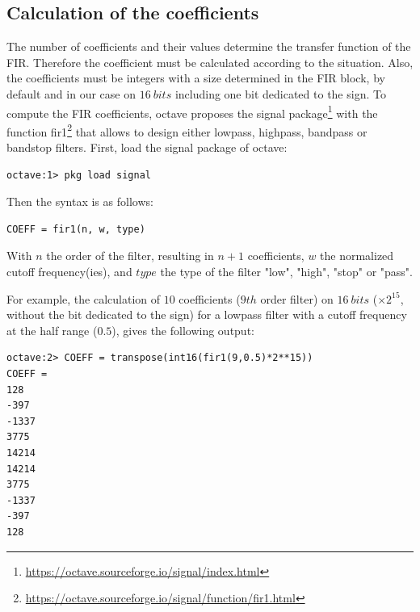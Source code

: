 \documentclass[12pt,oneside]{article}
\begin{document}
\subsection{Calculation of the coefficients}

The number of coefficients and their values determine the transfer function of the FIR. Therefore the coefficient must be calculated according to the situation. Also, the coefficients must be integers with a size determined in the FIR block, by default and in our case on $16~bits$ including one bit dedicated to the sign. 
\newline\newline
To compute the FIR coefficients, octave proposes the signal package\footnote{\href{https://octave.sourceforge.io/signal/index.html}{https://octave.sourceforge.io/signal/index.html}} with the function fir1\footnote{\href{https://octave.sourceforge.io/signal/function/fir1.html}{https://octave.sourceforge.io/signal/function/fir1.html}} that allows to design either lowpass, highpass, bandpass or bandstop filters. First, load the signal package of octave:

\vspace{0.2cm}
\begin{lstlisting}
octave:1> pkg load signal
\end{lstlisting}
\vspace{+0.5cm}

Then the syntax is as follows:

\vspace{-0.1cm}
\begin{lstlisting}
COEFF = fir1(n, w, type)
\end{lstlisting}
\vspace{+0.5cm}

With $n$ the order of the filter, resulting in $n+1$ coefficients, $w$ the normalized cutoff frequency(ies), and $type$ the type of the filter "low", "high", "stop" or "pass". 

For example, the calculation of $10$ coefficients ($9th$ order filter) on $16~bits$ ($\times 2^{15}$, without the bit dedicated to the sign) for a lowpass filter with a cutoff frequency at the half range ($0.5$), gives the following output: 

\vspace{-0.1cm}
\begin{lstlisting}
octave:2> COEFF = transpose(int16(fir1(9,0.5)*2**15))
COEFF =
128
-397
-1337
3775
14214
14214
3775
-1337
-397
128
\end{lstlisting}
\vspace{+0.5cm}
\end{document}
